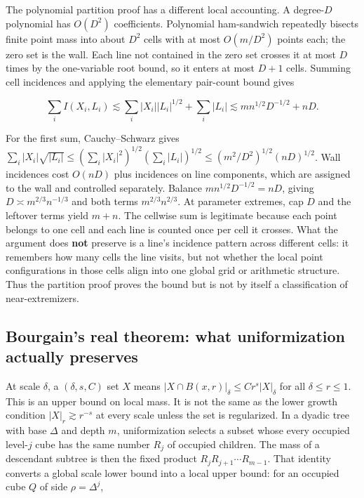 The polynomial partition proof has a different local accounting. A degree-\(D\) polynomial has \(O(D^2)\) coefficients. Polynomial ham-sandwich repeatedly bisects finite point mass into about \(D^2\) cells with at most \(O(m/D^2)\) points each; the zero set is the wall. Each line not contained in the zero set crosses it at most \(D\) times by the one-variable root bound, so it enters at most \(D+1\) cells. Summing cell incidences and applying the elementary pair-count bound gives

\[\sum_i I(X_i,L_i)\lesssim \sum_i |X_i||L_i|^{1/2}+\sum_i|L_i|\lesssim m n^{1/2}D^{-1/2}+nD.\]

For the first sum, Cauchy--Schwarz gives \(\sum_i|X_i|\sqrt{|L_i|}\le(\sum_i|X_i|^2)^{1/2}(\sum_i|L_i|)^{1/2}\le(m^2/D^2)^{1/2}(nD)^{1/2}\). Wall incidences cost \(O(nD)\) plus incidences on line components, which are assigned to the wall and controlled separately. Balance \(m n^{1/2}D^{-1/2}=nD\), giving \(D\asymp m^{2/3}n^{-1/3}\) and both terms \(m^{2/3}n^{2/3}\). At parameter extremes, cap \(D\) and the leftover terms yield \(m+n\). The cellwise sum is legitimate because each point belongs to one cell and each line is counted once per cell it crosses. What the argument does \textbf{not} preserve is a line's incidence pattern across different cells: it remembers how many cells the line visits, but not whether the local point configurations in those cells align into one global grid or arithmetic structure. Thus the partition proof proves the bound but is not by itself a classification of near-extremizers.

\subsection{Bourgain's real theorem: what uniformization actually preserves}\label{04-visual-computing-ii-ch033-bourgains-real-theorem-what-uniformization-actually-preserves}

\hypertarget{04-visual-computing-ii-ch033-bourgains-real-theorem-what-uniformization-actually-preserves}{}

At scale \(\delta\), a \((\delta,s,C)\) set \(X\) means \(|X\cap B(x,r)|_\delta\le Cr^s|X|_\delta\) for all \(\delta\le r\le1\). This is an upper bound on local mass. It is not the same as the lower growth condition \(|X|_r\gtrsim r^{-s}\) at every scale unless the set is regularized. In a dyadic tree with base \(\Delta\) and depth \(m\), uniformization selects a subset whose every occupied level-\(j\) cube has the same number \(R_j\) of occupied children. The mass of a descendant subtree is then the fixed product \(R_jR_{j+1}\cdots R_{m-1}\). That identity converts a global scale lower bound into a local upper bound: for an occupied cube \(Q\) of side \(\rho=\Delta^j\),

